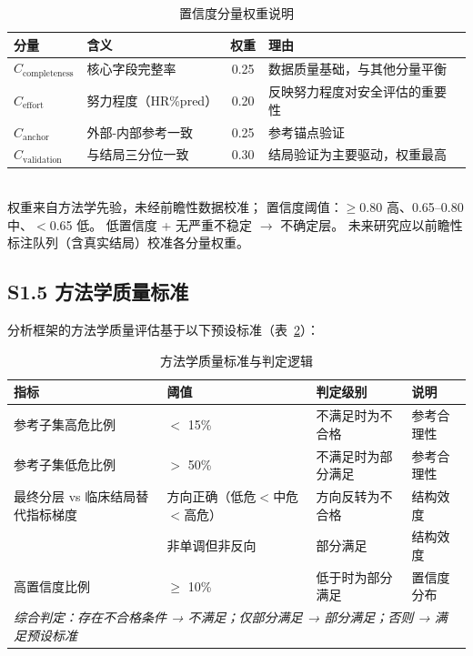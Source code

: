 \documentclass[12pt, a4paper]{ctexart}
\begin{document}
\begin{table}[htbp]
\centering
\small
\caption{置信度分量权重说明}
\label{tab:s3_confidence_weights}
\begin{tabular}{llcl}
\toprule
分量 & 含义 & 权重 & 理由 \\
\midrule
$C_{\text{completeness}}$ & 核心字段完整率 & 0.25 & 数据质量基础，与其他分量平衡 \\
$C_{\text{effort}}$ & 努力程度（HR\%pred） & 0.20 & 反映努力程度对安全评估的重要性 \\
$C_{\text{anchor}}$ & 外部-内部参考一致 & 0.25 & 参考锚点验证 \\
$C_{\text{validation}}$ & 与结局三分位一致 & 0.30 & 结局验证为主要驱动，权重最高 \\
\bottomrule
\end{tabular}
\\[1ex]
{\footnotesize 权重来自方法学先验，未经前瞻性数据校准；
置信度阈值：$\geq$0.80 高、0.65--0.80 中、$<$0.65 低。
低置信度 + 无严重不稳定 $\to$ 不确定层。
未来研究应以前瞻性标注队列（含真实结局）校准各分量权重。}
\end{table}

\subsection*{S1.5 方法学质量标准}

分析框架的方法学质量评估基于以下预设标准（表~\ref{tab:s4_acceptance}）：

\begin{table}[htbp]
\centering
\small
\caption{方法学质量标准与判定逻辑}
\label{tab:s4_acceptance}
\begin{tabular}{llll}
\toprule
指标 & 阈值 & 判定级别 & 说明 \\
\midrule
参考子集高危比例 & $<$ 15\% & 不满足时为不合格 & 参考合理性 \\
参考子集低危比例 & $>$ 50\% & 不满足时为部分满足 & 参考合理性 \\
最终分层 vs 临床结局替代指标梯度 & 方向正确（低危$<$中危$<$高危）& 方向反转为不合格 & 结构效度 \\
 & 非单调但非反向 & 部分满足 & 结构效度 \\
高置信度比例 & $\geq$ 10\% & 低于时为部分满足 & 置信度分布 \\
\midrule
\multicolumn{4}{l}{\textit{综合判定：存在不合格条件 → 不满足；仅部分满足 → 部分满足；否则 → 满足预设标准}} \\
\bottomrule
\end{tabular}
\end{table}
\end{document}
